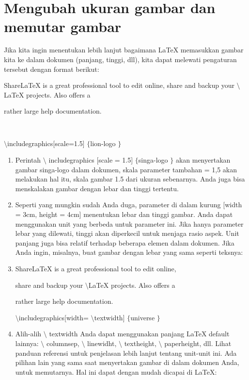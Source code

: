 \section{ Mengubah ukuran gambar dan memutar gambar }



\noindent
Jika kita ingin menentukan lebih lanjut bagaimana LaTeX memasukkan gambar kita ke dalam dokumen (panjang, tinggi, dll), kita dapat melewati pengaturan tersebut dengan format berikut: \par
\vspace{16pt}
\noindent
ShareLaTeX is a great professional tool to edit online,
\vspace{12pt}
\noindent
share and backup your  $  \setminus  $LaTeX projects. Also offers a

rather large help documentation. \par

 $  $ \par

 $  \setminus  $includegraphics[scale=1.5] $  \{  $lion-logo $  \}  $ \par
\vspace{16pt}
\vspace{16pt}
\noindent

\begin{enumerate}
	\item Perintah  $  \setminus  $ includegraphics [scale = 1.5]  $  \{  $singa-logo $  \}  $ akan menyertakan gambar singa-logo dalam dokumen, skala parameter tambahan = 1,5 akan melakukan hal itu, skala gambar 1.5 dari ukuran sebenarnya. Anda juga bisa menskalakan gambar dengan lebar dan tinggi tertentu.

\item Seperti yang mungkin sudah Anda duga, parameter di dalam kurung [width = 3cm, height = 4cm] menentukan lebar dan tinggi gambar. Anda dapat menggunakan unit yang berbeda untuk parameter ini. Jika hanya parameter lebar yang dilewati, tinggi akan diperkecil untuk menjaga rasio aspek. Unit panjang juga bisa relatif terhadap beberapa elemen dalam dokumen. Jika Anda ingin, misalnya, buat gambar dengan lebar yang sama seperti teksnya:

\item ShareLaTeX is a great professional tool to edit online,

share and backup your  $  \setminus  $LaTeX projects. Also offers a

rather large help documentation.

 $  \setminus $includegraphics[width= $  \setminus $textwidth] $  \{  $universe $  \}  $

\item Alih-alih  $  \setminus $ textwidth Anda dapat menggunakan panjang LaTeX default lainnya:  $  \setminus $ columnsep,  $  \setminus $ linewidht,  $  \setminus $ textheight,  $  \setminus $ paperheight, dll. Lihat panduan referensi untuk penjelasan lebih lanjut tentang unit-unit ini. Ada pilihan lain yang sama saat menyertakan gambar di dalam dokumen Anda, untuk memutarnya. Hal ini dapat dengan mudah dicapai di LaTeX:



\end{enumerate}

